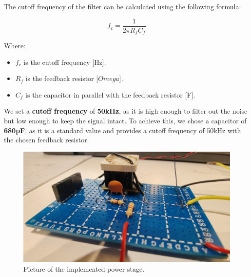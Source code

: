 \begin{samepage}
    The cutoff frequency of the filter can be calculated using the following formula:
    \nopagebreak

    \begin{equation*}
        f_c = \frac{1}{2\pi R_f C_f}
    \end{equation*}
    \nopagebreak

    Where:
    \nopagebreak
    \begin{itemize}
        \item $f_c$ is the cutoff frequency [Hz].
        \item $R_f$ is the feedback resistor [$Omega$].
        \item $C_f$ is the capacitor in parallel with the feedback resistor [F].
    \end{itemize}
\end{samepage}


We set a \textbf{cutoff frequency} of \textbf{50kHz}, as it is high enough to filter out the noise but low enough to keep the signal intact.
To achieve this, we chose a capacitor of \textbf{680pF}, as it is a standard value and provides a cutoff frequency of 50kHz with the chosen feedback resistor.

\begin{figure}[H]
    \centering
    \includegraphics[width = 0.7\linewidth]{Chapters/Chapter4/Figures/irl_power_stage.jpg}
    \caption{Picture of the implemented power stage.}
    \label{fig:IRL_power_stage}
\end{figure}
